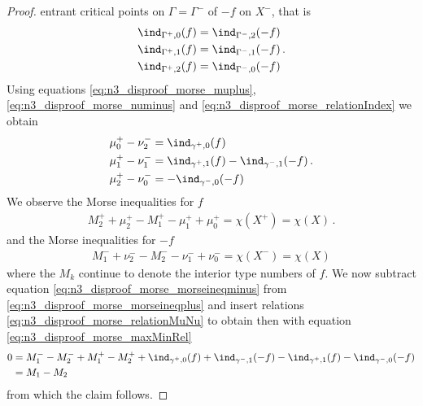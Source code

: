 \begin{proof}
  entrant critical points on $\Gamma=\Gamma^-$ of $-f$ on $X^-$, that is
  \begin{equation}
    \begin{aligned}
      \ind_{\Gamma^+,0}(f)&=\ind_{\Gamma^-,2}(-f) \\
      \ind_{\Gamma^+,1}(f)&=\ind_{\Gamma^-,1}(-f) \\
      \ind_{\Gamma^+,2}(f)&=\ind_{\Gamma^-,0}(-f)\label{eq:n3_disproof_morse_relationIndex} 
    \end{aligned}\,.
  \end{equation}
  Using equations \eqref{eq:n3_disproof_morse_muplus}, \eqref{eq:n3_disproof_morse_numinus} and \eqref{eq:n3_disproof_morse_relationIndex}
  we obtain
  \begin{equation}
    \begin{aligned}
      \mu^+_0-\nu^-_2&=\ind_{\gamma^+,0}(f) \\
      \mu^+_1-\nu^-_1&=\ind_{\gamma^+,1}(f)-\ind_{\gamma^-,1}(-f) \\
      \mu^+_2-\nu^-_0&=-\ind_{\gamma^-,0}(-f)
    \end{aligned}\,.\label{eq:n3_disproof_morse_relationMuNu}
  \end{equation}
  We observe the Morse inequalities for $f$
  \begin{align}
    M_2^++\mu^+_2-M_1^+-\mu^+_1+\mu^+_0=\chi(X^+)=\chi(X)\,.\label{eq:n3_disproof_morse_morseineqplus}
  \end{align}
  and the Morse inequalities for $-f$
  \begin{align}
    M_1^-+\nu^-_2-M_2^--\nu^-_1+\nu^-_0=\chi(X^-)=\chi(X)\label{eq:n3_disproof_morse_morseineqminus}
  \end{align}
  where the $M_k$ continue to denote the interior type numbers of $f$.
  We now subtract equation \eqref{eq:n3_disproof_morse_morseineqminus} from \eqref{eq:n3_disproof_morse_morseineqplus}
  and insert relations \eqref{eq:n3_disproof_morse_relationMuNu} to obtain
  then with equation \eqref{eq:n3_disproof_morse_maxMinRel}
  \begin{align*}
    0&=M_1^--M_2^-+M_1^+-M_2^++\ind_{\gamma^+,0}(f)+\ind_{\gamma^-,1}(-f)-\ind_{\gamma^+,1}(f)-\ind_{\gamma^-,0}(-f) \\
    &= M_1-M_2
  \end{align*}
  from which the claim follows.


\end{proof}
